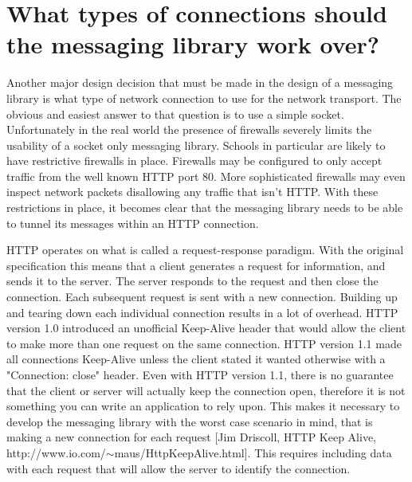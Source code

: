 \documentclass{article}
\begin{document}
\section{What types of connections should the messaging library work over?}

Another major design decision that must be made in the design of a
messaging library is what type of network connection to use for the
network transport.  The obvious and easiest answer to that question is
to use a simple socket.  Unfortunately in the real world the presence
of firewalls severely limits the usability of a socket only
messaging library.  Schools in particular are likely to have
restrictive firewalls in place.  Firewalls may be configured to only
accept traffic from the well known HTTP port 80.  More sophisticated
firewalls may even inspect network packets disallowing any traffic
that isn't HTTP.  With these restrictions in place, it becomes clear
that the messaging library needs to be able to tunnel its messages
within an HTTP connection.

HTTP operates on what is called a request-response paradigm.  With the
original specification this means that a client generates a
request for information, and sends it to the server.  The server
responds to the request and then close the connection.  Each subsequent
request is sent with a new connection.  Building up and tearing down
each individual connection results in a lot of overhead.  HTTP
version 1.0 introduced an unofficial Keep-Alive header that would
allow the client to make more than one request on the same
connection.  HTTP version 1.1 made all connections Keep-Alive unless
the client stated it wanted otherwise with a "Connection: close"
header.  Even with HTTP version 1.1, there is no guarantee that the
client or server will actually keep the connection open, therefore it
is not something you can write an application to rely upon.  This
makes it necessary to develop the messaging library with the worst
case scenario in mind, that is making a new connection for each
request [Jim Driscoll, HTTP Keep Alive,
http://www.io.com/$\sim$maus/HttpKeepAlive.html].
This requires including data with each request that will
allow the server to identify the connection.
\end{document}
